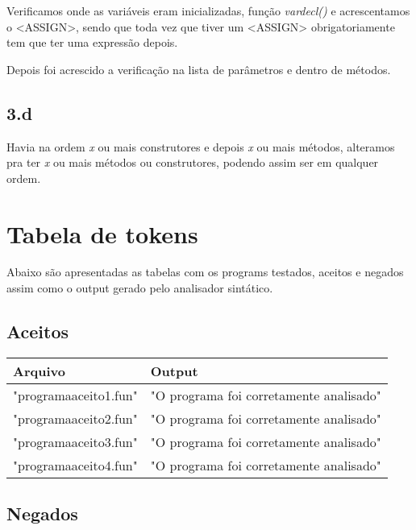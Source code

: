 \documentclass[
	article,			%
	11pt,				%
	oneside,			%
	a4paper,			%
	portuguese,			%
	brazil,				%
	sumario=tradicional
	]{abntex2}
\begin{document}
Verificamos onde as variáveis eram inicializadas, função \textit{vardecl()} e acrescentamos o <ASSIGN>, sendo que toda vez que tiver um <ASSIGN> obrigatoriamente tem que ter uma expressão depois.

Depois foi acrescido a verificação na lista de parâmetros e dentro de métodos.

\subsection{3.d}

Havia na ordem \textit{x} ou mais construtores e depois \textit{x} ou mais métodos, alteramos pra ter \textit{x} ou mais métodos ou construtores, podendo assim ser em qualquer ordem.

\newpage
\section{Tabela de tokens}

Abaixo são apresentadas as tabelas com os programs testados, aceitos e negados assim como o output gerado pelo analisador sintático.

\subsection{Aceitos}

\begin{center}
\begin{table}[H]
\begin{tabularx}{1\textwidth}{p{5cm}|X}
Arquivo & Output \\
\hline
"programaaceito1.fun" & "O programa foi corretamente analisado" \\
"programaaceito2.fun" & "O programa foi corretamente analisado" \\
"programaaceito3.fun" & "O programa foi corretamente analisado" \\
"programaaceito4.fun" & "O programa foi corretamente analisado" \\ \hline
\end{tabularx}
\end{table}
\end{center}

\subsection{Negados}
\end{document}
